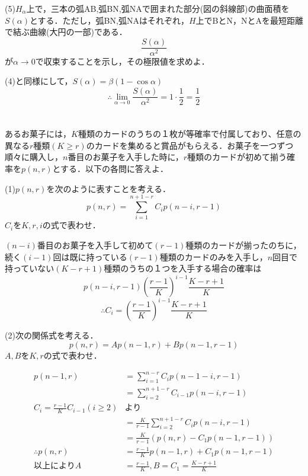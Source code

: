 \documentclass[a4j]{jarticle}
\begin{document}
\begin{screen}
 (5)$H_\alpha$上で，三本の弧AB,弧BN,弧NAで囲まれた部分(図の斜線部)の曲面積を$S(\alpha)$とする．ただし，弧BN,弧NAはそれぞれ，$H$上でBとN，NとAを最短距離で結ぶ曲線(大円の一部)である．
 $$\frac{S(\alpha)}{\alpha^2}$$
 が$\alpha\rightarrow 0$で収束することを示し，その極限値を求めよ．
\end{screen}

(4)と同様にして，$S(\alpha)=\beta(1-\cos\alpha)$
$$\therefore \lim_{\alpha\rightarrow 0}\frac{S(\alpha)}{\alpha^2}=1\cdot \frac{1}{2}=\frac{1}{2}$$

\section{}
\begin{screen}
 あるお菓子には，$K$種類のカードのうちの１枚が等確率で付属しており、任意の異なる$r$種類$(K\geq r)$のカードを集めると賞品がもらえる．お菓子を一つずつ順々に購入し，$n$番目のお菓子を入手した時に，$r$種類のカードが初めて揃う確率を$p(n,r)$とする．以下の各問に答えよ．
\end{screen}

\begin{screen}
 (1)$p(n,r)$を次のように表すことを考える．
 $$p(n,r)=\sum_{i=1}^{n+1-r}C_ip(n-i,r-1)$$
 $C_i$を$K,r,i$の式で表わせ．
\end{screen}

$(n-i)$番目のお菓子を入手して初めて$(r-1)$種類のカードが揃ったのちに，続く$(i-1)$回は既に持っている$(r-1)$種類のカードのみを入手し，$n$回目で持っていない$(K-r+1)$種類のうちの１つを入手する場合の確率は
$$p(n-i,r-1)\left(\frac{r-1}{K}\right)^{i-1}\frac{K-r+1}{K}$$
$$\therefore C_i = \left(\frac{r-1}{K}\right)^{i-1}\frac{K-r+1}{K}$$
\begin{screen}
 (2)次の関係式を考える．
 $$p(n,r)=Ap(n-1,r)+Bp(n-1,r-1)$$
 $A,B$を$K,r$の式で表わせ．
\end{screen}

\begin{align*}
 p(n-1,r) &= \sum_{i=1}^{n-r}C_i p(n-1-i,r-1)\\
 &= \sum_{i=2}^{n+1-r}C_{i-1} p(n-i,r-1)\\
 C_i = \frac{r-1}{K}C_{i-1} (i\geq 2)& \mbox{より} \\
 &= \frac{K}{r-1}\sum_{i=2}^{n+1-r}C_i p(n-i,r-1)\\
 &= \frac{K}{r-1}\left(p(n,r) - C_1p(n-1,r-1)\right)\\
 \therefore p(n,r) &= \frac{r-1}{K}p(n-1,r) + C_1 p(n-1,r-1)\\
 \mbox{以上により}A&=\frac{r-1}{K}, B=C_1 = \frac{K-r+1}{K}
\end{align*}
\end{document}
